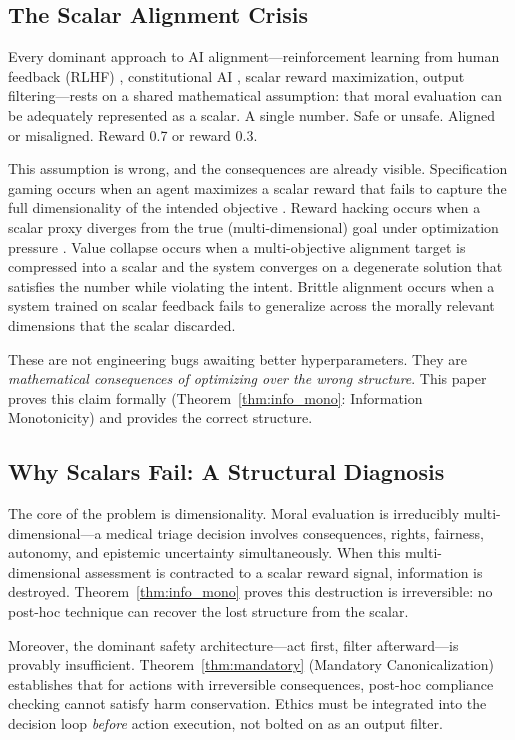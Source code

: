 \documentclass[12pt]{article}
\theoremstyle{definition}
\theoremstyle{remark}
\begin{document}
\subsection{The Scalar Alignment Crisis}

Every dominant approach to AI alignment---reinforcement learning from human feedback (RLHF) \citep{christiano2017}, constitutional AI \citep{bai2022}, scalar reward maximization, output filtering---rests on a shared mathematical assumption: that moral evaluation can be adequately represented as a scalar. A single number. Safe or unsafe. Aligned or misaligned. Reward 0.7 or reward 0.3.

This assumption is wrong, and the consequences are already visible. Specification gaming occurs when an agent maximizes a scalar reward that fails to capture the full dimensionality of the intended objective \citep{krakovna2020}. Reward hacking occurs when a scalar proxy diverges from the true (multi-dimensional) goal under optimization pressure \citep{skalse2022}. Value collapse occurs when a multi-objective alignment target is compressed into a scalar and the system converges on a degenerate solution that satisfies the number while violating the intent. Brittle alignment occurs when a system trained on scalar feedback fails to generalize across the morally relevant dimensions that the scalar discarded.

These are not engineering bugs awaiting better hyperparameters. They are \emph{mathematical consequences of optimizing over the wrong structure}. This paper proves this claim formally (Theorem~\ref{thm:info_mono}: Information Monotonicity) and provides the correct structure.

\subsection{Why Scalars Fail: A Structural Diagnosis}

The core of the problem is dimensionality. Moral evaluation is irreducibly multi-dimensional---a medical triage decision involves consequences, rights, fairness, autonomy, and epistemic uncertainty simultaneously. When this multi-dimensional assessment is contracted to a scalar reward signal, information is destroyed. Theorem~\ref{thm:info_mono} proves this destruction is irreversible: no post-hoc technique can recover the lost structure from the scalar.

Moreover, the dominant safety architecture---act first, filter afterward---is provably insufficient. Theorem~\ref{thm:mandatory} (Mandatory Canonicalization) establishes that for actions with irreversible consequences, post-hoc compliance checking cannot satisfy harm conservation. Ethics must be integrated into the decision loop \emph{before} action execution, not bolted on as an output filter.
\end{document}
